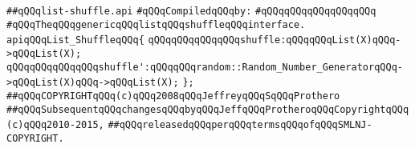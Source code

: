 \label{src/lib/src/list-shuffle.api}
\verb|##qQQqlist-shuffle.api|\newline
\newline
\verb|#qQQqCompiledqQQqby:|\newline
\verb|#qQQqqQQqqQQqqQQqqQQq|\newline
\newline
\newline
\newline
\verb|#qQQqTheqQQqgenericqQQqlistqQQqshuffleqQQqinterface.|\newline
\newline
\newline
\newline
\newline
\newline
\verb|apiqQQqList_ShuffleqQQq{|\newline
\newline
\verb|qQQqqQQqqQQqqQQqshuffle:qQQqqQQqList(X)qQQq->qQQqList(X);|\newline
\newline
\verb|qQQqqQQqqQQqqQQqshuffle':qQQqqQQqrandom::Random_Number_GeneratorqQQq->qQQqList(X)qQQq->qQQqList(X);|\newline
\newline
\verb|};|\newline
\newline
\newline
\verb|##qQQqCOPYRIGHTqQQq(c)qQQq2008qQQqJeffreyqQQqSqQQqProthero|\newline
\verb|##qQQqSubsequentqQQqchangesqQQqbyqQQqJeffqQQqProtheroqQQqCopyrightqQQq(c)qQQq2010-2015,|\newline
\verb|##qQQqreleasedqQQqperqQQqtermsqQQqofqQQqSMLNJ-COPYRIGHT.|\newline

